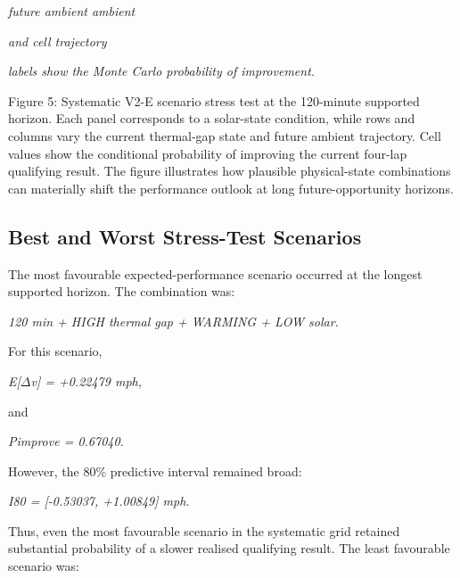 \begin{center}\textit{future ambient                                           ambient}\end{center}

\begin{center}\textit{and cell         trajectory}\end{center}

\begin{center}\textit{labels show  the Monte Carlo probability of improvement.}\end{center}

Figure 5: Systematic V2-E scenario stress test at the 120-minute supported horizon. Each panel corresponds to a solar-state condition, while rows and columns vary the current thermal-gap state and future ambient trajectory. Cell values show the conditional probability of improving the current four-lap qualifying result. The figure illustrates how plausible physical-state combinations can materially shift the performance outlook at long future-opportunity horizons.

\subsection{Best and Worst Stress-Test Scenarios}
The most favourable expected-performance scenario occurred at the longest supported horizon. The combination was:

\begin{center}\textit{120 min + HIGH thermal gap + WARMING + LOW solar.}\end{center}

For this scenario,

\begin{center}\textit{E[\ensuremath{\Delta}v] = +0.22479 mph,}\end{center}

and

\begin{center}\textit{Pimprove = 0.67040.}\end{center}

However, the 80\% predictive interval remained broad:

\begin{center}\textit{I80 = [-0.53037, +1.00849] mph.}\end{center}

Thus, even the most favourable scenario in the systematic grid retained substantial probability of a slower realised qualifying result. The least favourable scenario was:


